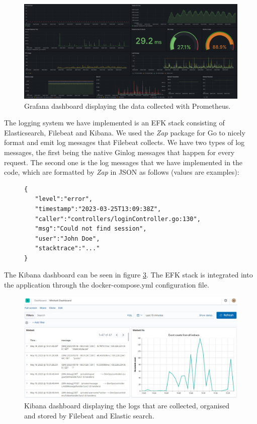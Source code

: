 \begin{figure}[H]
    \centering
    \includegraphics[width=\textwidth]{images/grafana.png}
    \caption{Grafana dashboard displaying the data collected with Prometheus.}
    \label{fig:grafana_dashboard}
\end{figure}

The logging system we have implemented is an EFK stack consisting of Elasticsearch, Filebeat and Kibana. We used the \textit{Zap} package for Go to nicely format and emit log messages that Filebeat collects. We have two types of log messages, the first being the native Ginlog messages that happen for every request. The second one is the log messages that we have implemented in the code, which are formatted by \textit{Zap} in JSON as follows (values are examples):

\begin{figure}[H]
    \begin{footnotesize}
        \begin{verbatim}
{
   "level":"error",
   "timestamp":"2023-03-25T13:09:38Z",
   "caller":"controllers/loginController.go:130",
   "msg":"Could not find session",
   "user":"John Doe",
   "stacktrace":"..."
}
        \end{verbatim}
    \end{footnotesize}
    \label{fig:my_label}
\end{figure}

The Kibana dashboard can be seen in figure \ref{fig:kibana_dashboard}. The EFK stack is integrated into the application through the docker-compose.yml configuration file.

\begin{figure}[H]
    \centering
    \includegraphics[width=\textwidth]{images/kibana.jpg}
    \caption{Kibana dashboard displaying the logs that are collected, organised and stored by Filebeat and Elastic search.}
    \label{fig:kibana_dashboard}
\end{figure}

